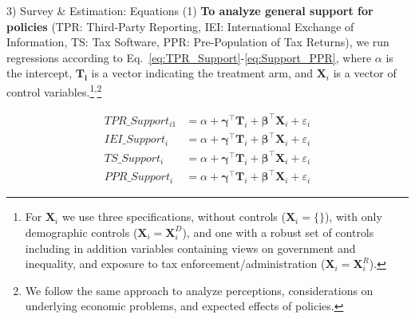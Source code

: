 \documentclass{beamer}
\begin{document}
\begin{frame}{3) Survey \& Estimation: Equations (1)} 
\label{equations1}
\textbf{To analyze general support for policies} (TPR: Third-Party Reporting, IEI: International Exchange of Information, TS: Tax Software, PPR: Pre-Population of Tax Returns), we run regressions according to Eq.~\eqref{eq:TPR_Support}-\eqref{eq:Support_PPR}, where $\alpha$ is the intercept, $\mathbf{T_i}$ is a vector indicating the treatment arm, and $\mathbf{X}_{i}$ is a vector of control variables.\footnote[5]{For $\mathbf{X}_{i}$ we use three specifications, without controls ($\mathbf{X}_{i} = \{\}$), with only demographic controls ($\mathbf{X}_{i} = \mathbf{X}_{i}^{D}$), and one with a robust set of controls including in addition variables containing views on government and inequality, and exposure to tax enforcement/administration ($\mathbf{X}_{i} = \mathbf{X}_{i}^{R}$).}\textsuperscript{,}\footnote[6]{We follow the same approach to analyze perceptions, considerations on underlying economic problems, and expected effects of policies.}
\vspace{-0.5cm}
\begin{center}
\begin{align}
\label{eq:TPR_Support}
        \text{$TPR\_Support_{i1}$} 
    &= \alpha + \boldsymbol{\gamma}^{\top}\mathbf{T}_i + \boldsymbol{\beta}^{\top}\mathbf{X}_{i} + \varepsilon_{i} \\[0.25em]
    \label{eq:IEI_Support}
        \text{$IEI\_Support_{i}$} 
    &= \alpha + \boldsymbol{\gamma}^{\top}\mathbf{T}_i + \boldsymbol{\beta}^{\top}\mathbf{X}_{i} +  \varepsilon_{i} \\
        \label{eq:Support_TS}
    \text{$TS\_Support_i$} 
    &= \alpha + \boldsymbol{\gamma}^{\top}\mathbf{T}_i + \boldsymbol{\beta}^{\top}\mathbf{X}_{i} + \varepsilon_{i} \\[0.25em]
    \label{eq:Support_PPR}
    \text{$PPR\_Support_i$} 
    &= \alpha + \boldsymbol{\gamma}^{\top}\mathbf{T}_i + \boldsymbol{\beta}^{\top}\mathbf{X}_{i} +  \varepsilon_{i} 
\end{align}
\end{center}
\hfill \hyperlink{Controlvariables}{} \hyperlink{Example:PolicySupportGen}{}
\end{frame}
\end{document}
